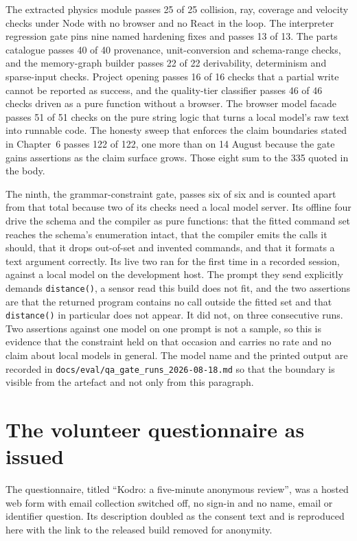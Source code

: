 \documentclass[11pt,a4paper]{report}
\newif\ifhumanfeedback
\begin{document}
The extracted physics module passes 25 of 25 collision, ray, coverage and velocity checks under Node with no browser and no React in the loop. The interpreter regression gate pins nine named hardening fixes and passes 13 of 13. The parts catalogue passes 40 of 40 provenance, unit-conversion and schema-range checks, and the memory-graph builder passes 22 of 22 derivability, determinism and sparse-input checks. Project opening passes 16 of 16 checks that a partial write cannot be reported as success, and the quality-tier classifier passes 46 of 46 checks driven as a pure function without a browser. The browser model facade passes 51 of 51 checks on the pure string logic that turns a local model's raw text into runnable code. The honesty sweep that enforces the claim boundaries stated in Chapter~6 passes 122 of 122, one more than on 14 August because the gate gains assertions as the claim surface grows. Those eight sum to the 335 quoted in the body.

The ninth, the grammar-constraint gate, passes six of six and is counted apart from that total because two of its checks need a local model server. Its offline four drive the schema and the compiler as pure functions: that the fitted command set reaches the schema's enumeration intact, that the compiler emits the calls it should, that it drops out-of-set and invented commands, and that it formats a text argument correctly. Its live two ran for the first time in a recorded session, against a local model on the development host. The prompt they send explicitly demands \texttt{distance()}, a sensor read this build does not fit, and the two assertions are that the returned program contains no call outside the fitted set and that \texttt{distance()} in particular does not appear. It did not, on three consecutive runs. Two assertions against one model on one prompt is not a sample, so this is evidence that the constraint held on that occasion and carries no rate and no claim about local models in general. The model name and the printed output are recorded in \texttt{docs/eval/qa\_gate\_runs\_2026-08-18.md} so that the boundary is visible from the artefact and not only from this paragraph.

\ifhumanfeedback
\section{The volunteer questionnaire as issued}
\label{app:questionnaire}
The questionnaire, titled ``Kodro: a five-minute anonymous review'', was a hosted web form with email collection switched off, no sign-in and no name, email or identifier question. Its description doubled as the consent text and is reproduced here with the link to the released build removed for anonymity.
\end{document}
